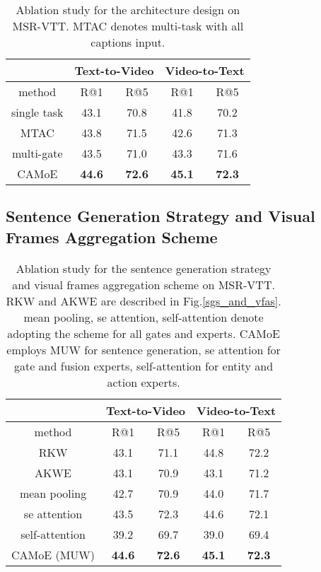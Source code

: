\documentclass[letterpaper]{article} \usepackage{aaai22}  \usepackage{times}  \usepackage{helvet}  \usepackage{courier}  \usepackage[hyphens]{url}  \usepackage{graphicx} \urlstyle{rm} \def\UrlFont{\rm}  \usepackage{natbib}  \usepackage{caption}
\begin{document}
\begin{table}[h]
\centering
\caption{Ablation study for the architecture design on MSR-VTT. MTAC denotes multi-task with all captions input.}
\label{ab_sd}
\begin{tabular}{c|c|c|c|c}
\hline
&\multicolumn{2}{c|}{Text-to-Video} & \multicolumn{2}{c}{Video-to-Text} \\
\hline
method &R@1  &R@5 &R@1 &R@5 \\
\hline
single task &43.1 &70.8 &41.8 &70.2 \\
MTAC &43.8 &71.5 &42.6 &71.3 \\
multi-gate &43.5 &71.0 &43.3 &71.6 \\
\hline
CAMoE &\textbf{44.6} &\textbf{72.6} &\textbf{45.1} &\textbf{72.3} \\
\hline
\end{tabular}
\end{table}

\subsection{Sentence Generation Strategy and Visual Frames Aggregation Scheme}



\begin{table}[h]
\centering
\caption{Ablation study for the sentence generation strategy and visual frames aggregation scheme on MSR-VTT. RKW and AKWE are described in Fig.\ref{sgs_and_vfas}. mean pooling, se attention, self-attention denote adopting the scheme for all gates and experts. CAMoE
employs MUW for sentence generation, se attention for gate and fusion experts, self-attention for entity and action experts.}
\label{ab_sgs}
\begin{tabular}{c|c|c|c|c}
\hline
&\multicolumn{2}{c|}{Text-to-Video} & \multicolumn{2}{c}{Video-to-Text} \\
\hline
method &R@1  &R@5 &R@1 &R@5 \\
\hline
RKW &43.1 &71.1 &44.8 &72.2 \\
AKWE &43.1 &70.9 &43.1 &71.2 \\
\hline 
mean pooling &42.7 &70.9 &44.0 &71.7 \\
se attention &43.5 &72.3 &44.6 &72.1 \\
self-attention &39.2 &69.7 &39.0 &69.4 \\
\hline
CAMoE (MUW) &\textbf{44.6} &\textbf{72.6} &\textbf{45.1} &\textbf{72.3} \\
\hline
\end{tabular}
\end{table}
\end{document}
